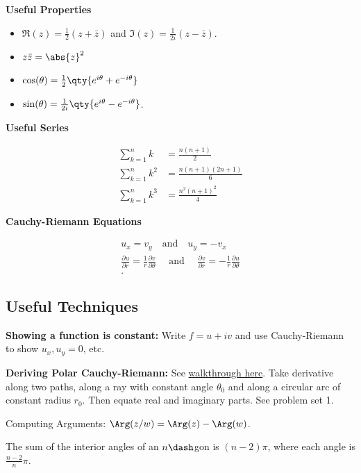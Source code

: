 \textbf{Useful Properties}

\begin{itemize}
\tightlist
\item
  \(\Re(z) = \frac 1 2 (z + \bar z)\) and
  \(\Im(z) = \frac{1}{2i}(z - \bar z)\).
\item
  \(z\bar z = \abs{z}^2\)
\item
  \(\cos(\theta) = \frac 1 2 \qty{e^{i\theta} + e^{-i\theta}}\)
\item
  \(\sin(\theta) = \frac{1}{2i}\qty{e^{i\theta} - e^{-i\theta}}\).
\end{itemize}

\textbf{Useful Series}

\begin{align*} 
\sum_{k=1}^{n} k &=\frac{n(n+1)}{2} \\ 
\sum_{k=1}^{n} k^{2} &=\frac{n(n+1)(2 n+1)}{6} \\ 
\sum_{k=1}^{n} k^{3} &=\frac{n^{2}(n+1)^{2}}{4} 
\end{align*}

\textbf{Cauchy-Riemann Equations}

\begin{align*}
u_x = v_y \quad\text{and}\quad u_y = -v_x \\
\frac{\partial u}{\partial r}=\frac{1}{r} \frac{\partial v}{\partial \theta} \quad \text { and } \quad \frac{\partial v}{\partial r}=-\frac{1}{r} \frac{\partial u}{\partial \theta} \\
.\end{align*}

\hypertarget{useful-techniques}{%
\subsection{Useful Techniques}\label{useful-techniques}}

\textbf{Showing a function is constant:} Write \(f = u + iv\) and use
Cauchy-Riemann to show \(u_x, u_y = 0\), etc.

\textbf{Deriving Polar Cauchy-Riemann:} See
\href{https://users.math.msu.edu/users/shapiro/Teaching/classes/425/crpolar.pdf}{walkthrough
here}. Take derivative along two paths, along a ray with constant angle
\(\theta_0\) and along a circular arc of constant radius \(r_0\). Then
equate real and imaginary parts. See problem set 1.

Computing Arguments: \(\Arg(z/w) = \Arg(z) - \Arg(w)\).

The sum of the interior angles of an \(n\dash\)gon is \((n-2)\pi\),
where each angle is \(\frac{n-2}{n}\pi\).





